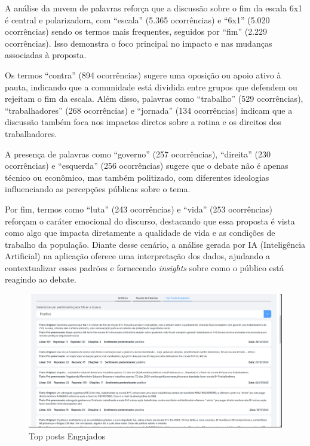 \documentclass[
	12pt,				%
	oneside,			%
	a4paper,			%
	english,			%
	french,				%
	spanish,			%
	brazil				%
	]{abntex2}
\begin{document}
A análise da nuvem de palavras reforça que a discussão sobre o fim da
escala 6x1 é central e polarizadora, com ``escala'' (5.365 ocorrências)
e ``6x1'' (5.020 ocorrências) sendo os termos mais frequentes, seguidos
por ``fim'' (2.229 ocorrências). Isso demonstra o foco principal no
impacto e nas mudanças associadas à proposta.

Os termos ``contra'' (894 ocorrências) sugere uma oposição ou apoio
ativo à pauta, indicando que a comunidade está dividida entre grupos que
defendem ou rejeitam o fim da escala. Além disso, palavras como
``trabalho'' (529 ocorrências), ``trabalhadores'' (268 ocorrências) e
``jornada'' (134 ocorrências) indicam que a discussão também foca nos
impactos diretos sobre a rotina e os direitos dos trabalhadores.

A presença de palavras como ``governo'' (257 ocorrências), ``direita''
(230 ocorrências) e ``esquerda'' (256 ocorrências) sugere que o debate
não é apenas técnico ou econômico, mas também politizado, com diferentes
ideologias influenciando as percepções públicas sobre o tema.

Por fim, termos como ``luta'' (243 ocorrências) e ``vida'' (253
ocorrências) reforçam o caráter emocional do discurso, destacando que
essa proposta é vista como algo que impacta diretamente a qualidade de
vida e as condições de trabalho da população. Diante desse cenário, a
análise gerada por IA (Inteligência Artificial) na aplicação oferece uma
interpretação dos dados, ajudando a contextualizar esses padrões e
fornecendo \emph{insights} sobre como o público está reagindo ao debate.

\begin{figure}[htbp]
\hypertarget{top_posts_engajados}{%
\caption{Top posts Engajados}\label{top_posts_engajados}
\begin{center}
\includegraphics[scale=0.3]{imagens/sentilytics/estudo-caso/top_posts_engajados.png}
\end{center}
}
\end{figure}
\end{document}
